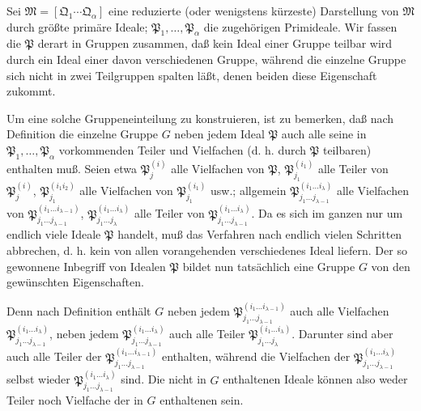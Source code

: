 \documentclass[11pt]{article}
\newcommand{\ideal}[1]{\mathfrak{#1}}
\begin{document}
Sei $\ideal M=[\ideal Q_1\cdots\ideal Q_\alpha]$ eine reduzierte (oder wenigstens kürzeste) Darstellung von $\ideal M$ durch größte primäre Ideale; $\ideal P_1,
\ldots,\ideal P_\alpha$ die zugehörigen Primideale. Wir fassen die $\ideal P$ derart in Gruppen zusammen, daß kein Ideal einer Gruppe teilbar wird durch ein Ideal einer davon verschiedenen Gruppe, während die einzelne Gruppe sich nicht in zwei Teilgruppen spalten läßt, denen beiden diese Eigenschaft zukommt.

Um eine solche Gruppeneinteilung zu konstruieren, ist zu bemerken, daß nach Definition die einzelne Gruppe $G$ neben jedem Ideal $\ideal P$ auch alle seine in $\ideal P_1,
\ldots,\ideal P_\alpha$ vorkommenden Teiler und Vielfachen (d. h. durch $\ideal P$ teilbaren) enthalten muß. Seien etwa $\ideal P_j^{(i)}$ alle Vielfachen von $\ideal P$, $\ideal P_{j_1}^{(i_1)}$ alle Teiler von $\ideal P_j^{(i)}$, $\ideal P_{j_1}^{(i_1 i_2)}$ alle Vielfachen von $\ideal P_{j_1}^{(i_1)}$ usw.; allgemein $\ideal P_{j_1\ldots j_{\lambda-1}}^{(i_1\ldots i_\lambda)}$ alle Vielfachen von $\ideal P_{j_1\ldots j_{\lambda-1}}^{(i_1\ldots i_{\lambda-1})}$, $\ideal P_{j_1\ldots j_\lambda}^{(i_1\ldots i_\lambda)}$ alle Teiler von $\ideal P_{j_1\ldots j_{\lambda-1}}^{(i_1\ldots i_\lambda)}$. Da es sich im ganzen nur um endlich viele Ideale $\ideal P$ handelt, muß das Verfahren nach endlich vielen Schritten abbrechen, d. h. kein von allen vorangehenden verschiedenes Ideal liefern. Der so gewonnene Inbegriff von Idealen $\ideal P$ bildet nun tatsächlich eine Gruppe $G$ von den gewünschten Eigenschaften.

Denn nach Definition enthält $G$ neben jedem $\ideal P_{j_1\ldots j_{\lambda-1}}^{(i_1\ldots i_{\lambda-1})}$ auch alle Vielfachen $\ideal P_{j_1\ldots j_{\lambda-1}}^{(i_1\ldots i_\lambda)}$, neben jedem $\ideal P_{j_1\ldots j_{\lambda-1}}^{(i_1\ldots i_\lambda)}$ auch alle Teiler $\ideal P_{j_1\ldots j_\lambda}^{(i_1\ldots i_\lambda)}$. Darunter sind aber auch alle Teiler der $\ideal P_{j_1\ldots j_{\lambda-1}}^{(i_1\ldots i_{\lambda-1})}$ enthalten, während die Vielfachen der $\ideal P_{j_1\ldots j_{\lambda-1}}^{(i_1\ldots i_\lambda)}$ selbst wieder $\ideal P_{j_1\ldots j_{\lambda-1}}^{(i_1\ldots i_\lambda)}$ sind. Die nicht in $G$ enthaltenen Ideale können also weder Teiler noch Vielfache der in $G$ enthaltenen sein.
\end{document}
